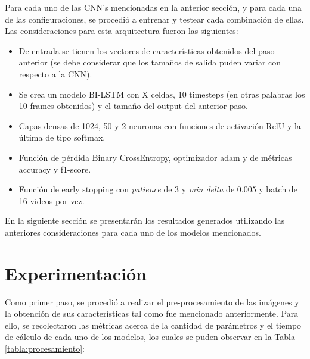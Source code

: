 Para cada uno de las CNN's mencionadas en la anterior sección, 
y para cada una de las configuraciones, se procedió a 
entrenar y testear cada combinación de ellas. Las consideraciones 
para esta arquitectura fueron las siguientes:

\begin{itemize}
    \item De entrada se tienen los vectores de características 
    obtenidos del paso anterior (se debe considerar que los 
    tamaños de salida puden variar con respecto a la CNN). 
    \item Se crea un modelo BI-LSTM con X celdas, 10 timesteps 
    (en otras palabras los 10 frames obtenidos) y el tamaño 
    del output del anterior paso.
    \item Capas densas de 1024, 50 y 2 neuronas con funciones 
    de activación RelU y la última de tipo softmax. 
    \item Función de pérdida Binary CrossEntropy, optimizador adam 
    y de métricas accuracy y f1-score.
    \item Función de early stopping con \textit{patience} de 3 y  
    \textit{min delta} de 0.005 y batch de 16 videos por vez.
\end{itemize}

En la siguiente sección se presentarán los resultados 
generados utilizando las anteriores consideraciones para 
cada uno de los modelos mencionados.

\section{Experimentación}

Como primer paso, se procedió a realizar el pre-procesamiento 
de las imágenes y la obtención de sus características tal 
como fue mencionado anteriormente. Para ello, se recolectaron 
las métricas acerca de la cantidad de parámetros y el 
tiempo de cálculo de cada uno de los modelos, los cuales 
se puden observar en la Tabla \ref{tabla:procesamiento}:

